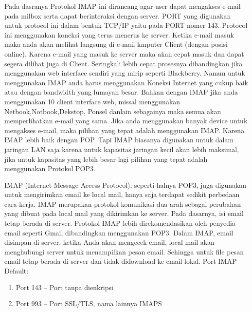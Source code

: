 	Pada dasranya Protokol IMAP ini dirancang agar user dapat mengakses e-mail pada milbox serta dapat berinteraksi dengan server. PORT yang digunakan untuk protocol ini dalam bentuk TCP/IP yaitu pada PORT nomer 143. Protocol ini menggunakan koneksi yang terus menerus ke server. Ketika e-mail masuk maka anda akan melihat langsung di e-mail kmputer Client (dengan posisi online). Karena e-mail yang masuk ke server maka akan cepat masuk dan dapat segera dilihat juga di Client. Seringkali lebih cepat prosesnya dibandingkan jika menggunakan web interface sendiri yang mirip seperti Blackberry. Namun untuk menggunakan IMAP anda harus menggunakan Koneksi Internet yang cukup baik atau dengan bandwidth yang lumayan besar. Bahkan dengan IMAP jika anda menggunakan 10 client interface web, missal menggunakan Netbook,Notbook,Dekstop, Ponsel danlain sebagainya maka semua akan memperlihatkan e-mail yang sama. Jika anda menggunakan banyak device untuk mengakses e-mail, maka pilihan yang tepat adalah menggunakan IMAP. Karena IMAP lebih baik dengan POP. Tapi IMAP biasanya digunakan untuk dalam jaringan LAN saja karena untuk kapasitas jaringan kecil akan lebih maksimal, jika untuk kapasitas yang lebih besar lagi pilihan yang tepat adalah menggunakan Protokol POP3.\par \vspace{12pt}
	IMAP (Internet Message Access Protocol), seperti halnya POP3, juga digunakan untuk mengirimkan email ke local mail, hanya saja terdapat sedikit perbedaan cara kerja.
	IMAP merupakan protokol komunikasi dua arah sebagai perubahan yang dibuat pada local mail yang dikirimkan ke server. Pada dasarnya, isi email tetap berada di server. Protokol IMAP lebih direkomendasikan oleh penyedia email seperti Gmail dibandingkan menggunakan POP3.
	Dalam IMAP, email disimpan di server. ketika Anda akan mengecek email, local mail akan menghubungi server untuk menampilkan pesan email. Sehingga untuk file pesan email tetap berada di server dan tidak didownload ke email lokal. Port IMAP Default: 
	\begin{enumerate}
		\item Port 143 – Port tanpa dienkripsi 
		\item Port 993 – Port SSL/TLS, nama lainnya IMAPS
	\end{enumerate}

